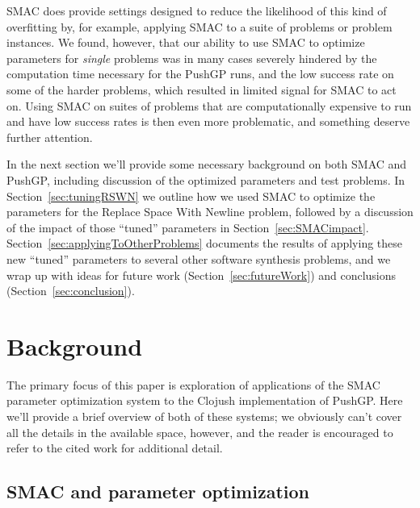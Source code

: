 SMAC does provide settings designed to reduce the likelihood of this kind of
overfitting by, for example, applying SMAC to a suite of problems or problem
instances. We found, however, that
our ability to use SMAC to optimize parameters for \emph{single} problems
was in many cases severely
hindered by the computation time necessary for the PushGP runs, and the low
success rate on some of the harder problems, which resulted in limited
signal for SMAC to act on. Using SMAC on suites of problems that are
computationally expensive to run and have low success rates is then even
more problematic, and something deserve further attention.

In the next section we'll provide some necessary background on both SMAC
and PushGP, including discussion of the optimized parameters and test
problems. In Section~\ref{sec:tuningRSWN} we outline how we 
used SMAC to optimize the parameters for the Replace Space With Newline
problem, followed by a discussion of the impact of those ``tuned''
parameters in Section~\ref{sec:SMACimpact}. 
Section~\ref{sec:applyingToOtherProblems} documents the results of
applying these new ``tuned'' parameters to several other software
synthesis problems, and we wrap up with ideas for future work
(Section~\ref{sec:futureWork}) and conclusions (Section~\ref{sec:conclusion}).

\section{Background}
\label{sec:background}

The primary focus of this paper is exploration of applications of the SMAC
parameter optimization system to the Clojush implementation of
PushGP. Here we'll provide a brief overview of both of these systems; we
obviously can't cover all the details in the available space, however, and the
reader is encouraged to refer to the cited work for additional detail.

\subsection{SMAC and parameter optimization}
\label{sec:SMACbackground}

